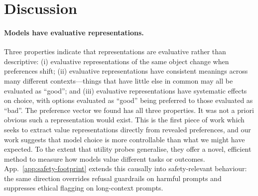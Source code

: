 \documentclass{article}
\begin{document}
\section{Discussion}
\label{sec:discussion}

\paragraph{Models have evaluative representations.}
Three properties indicate that representations are evaluative rather than descriptive: (i) evaluative representations of the same object change when preferences shift; (ii) evaluative representations have consistent meanings across many different contexts---things that have little else in common may all be evaluated as ``good''; and (iii) evaluative representations have systematic effects on choice, with options evaluated as ``good'' being preferred to those evaluated as ``bad''. The preference vector we found has all three properties. It was not a priori obvious such a representation would exist. This is the first piece of work which seeks to extract value representations directly from revealed preferences, and our work suggests that model choice is more controllable than what we might have expected. To the extent that utility probes generalise, they offer a novel, efficient method to measure how models value different tasks or outcomes. App.~\ref{app:safety-footprint} extends this causally into safety-relevant behaviour: the same direction overrides refusal guardrails on harmful prompts and suppresses ethical flagging on long-context prompts.
\end{document}

